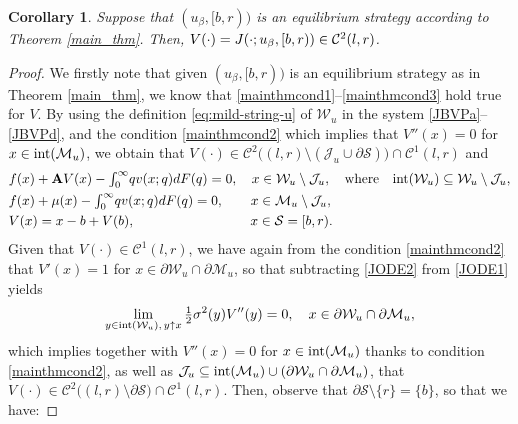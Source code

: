 \documentclass[11pt]{article} %
\newtheorem{corollary}[theorem]{Corollary}
\numberwithin{komcounter}{section}
\begin{document}
\begin{corollary}\label{coq_beta}
Suppose that $(u_\beta,[b,r))$ is an equilibrium strategy according to Theorem \ref{main_thm}. Then, $V(\cdot) = J(\cdot;u_\beta,[b,r)) \in {\cal C}^2(l,r)$.
\end{corollary}
\begin{proof}
We firstly note that given $(u_\beta,[b,r))$ is an equilibrium strategy as in Theorem \ref{main_thm}, we know that \eqref{mainthmcond1}--\eqref{mainthmcond3} hold true for $V$. 
By using the definition \eqref{eq:mild-string-u} of $\mathcal{W}_u$ in the system \eqref{JBVPa}--\eqref{JBVPd}, and the condition \eqref{mainthmcond2} which implies that $V''(x)=0$ for $x \in {\rm int}(\mathcal{M}_{u})$, we obtain that 
$V(\cdot)\in \mathcal{C}^2\big( (l,r)\setminus(\mathcal{J}_u\cup \partial\mathcal{S}) \big) \cap \mathcal{C}^1(l,r)$ and  
\begin{align} 
&f(x) + \mathbf{A} V(x) - \textstyle{\int_{0}^{\infty}} q v(x;q) dF(q) = 0, \quad x \in \mathcal{W}_u \setminus \mathcal{J}_u, \quad \text{where} \quad {\rm int}(\mathcal{W}_u) \subseteq \mathcal{W}_u \setminus \mathcal{J}_u, \label{JODE1}\\
&f(x) + \mu(x) - \textstyle{\int_{0}^{\infty}} q v(x;q) dF(q) = 0, \qquad x \in 
\mathcal{M}_u \setminus \mathcal{J}_u, \label{JODE2}\\  
&V(x) = x - b + V(b), \qquad \qquad \qquad \qquad \;\; x \in \mathcal{S}=[b,r). \label{JODE3} %
\end{align}
Given that $V(\cdot) \in  \mathcal{C}^1(l,r)$, we have again from the condition \eqref{mainthmcond2} that $V'(x)=1$ for $x\in\partial \mathcal{W}_u \cap \partial \mathcal{M}_u$, so that subtracting \eqref{JODE2} from \eqref{JODE1} yields 
\begin{align*}
\lim_{y \in {\rm int}(\mathcal{W}_u),\, y \uparrow x} \tfrac12 \sigma^2(y) V''(y) =0, \quad x \in \partial \mathcal{W}_{u} \cap \partial \mathcal{M}_{u},
\end{align*}
which implies together with $V''(x)=0$ for $x \in {\rm int}(\mathcal{M}_{u})$ thanks to condition \eqref{mainthmcond2}, as well as $\mathcal{J}_u \subseteq {\rm int}(\mathcal{M}_{u})\cup(\partial \mathcal{W}_{u} \cap \partial \mathcal{M}_{u})$, that 
$V(\cdot)\in \mathcal{C}^2\big( (l,r)\setminus \partial\mathcal{S} \big) \cap \mathcal{C}^1(l,r)$.
Then, observe that $\partial\mathcal{S} \setminus\{r\} = \{b\}$, so that we have:


\end{proof}
\end{document}
